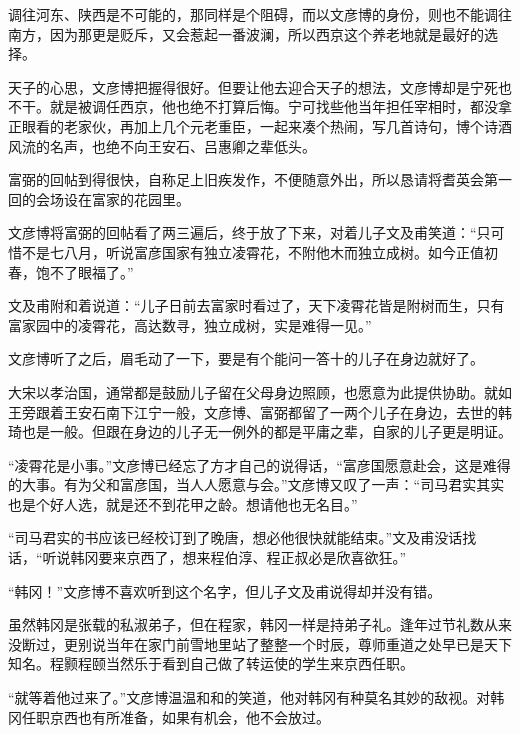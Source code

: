 调往河东、陕西是不可能的，那同样是个阻碍，而以文彦博的身份，则也不能调往南方，因为那更是贬斥，又会惹起一番波澜，所以西京这个养老地就是最好的选择。

天子的心思，文彦博把握得很好。但要让他去迎合天子的想法，文彦博却是宁死也不干。就是被调任西京，他也绝不打算后悔。宁可找些他当年担任宰相时，都没拿正眼看的老家伙，再加上几个元老重臣，一起来凑个热闹，写几首诗句，博个诗酒风流的名声，也绝不向王安石、吕惠卿之辈低头。

富弼的回帖到得很快，自称足上旧疾发作，不便随意外出，所以恳请将耆英会第一回的会场设在富家的花园里。

文彦博将富弼的回帖看了两三遍后，终于放了下来，对着儿子文及甫笑道：“只可惜不是七八月，听说富彦国家有独立凌霄花，不附他木而独立成树。如今正值初春，饱不了眼福了。”

文及甫附和着说道：“儿子日前去富家时看过了，天下凌霄花皆是附树而生，只有富家园中的凌霄花，高达数寻，独立成树，实是难得一见。”

文彦博听了之后，眉毛动了一下，要是有个能问一答十的儿子在身边就好了。

大宋以孝治国，通常都是鼓励儿子留在父母身边照顾，也愿意为此提供协助。就如王旁跟着王安石南下江宁一般，文彦博、富弼都留了一两个儿子在身边，去世的韩琦也是一般。但跟在身边的儿子无一例外的都是平庸之辈，自家的儿子更是明证。

“凌霄花是小事。”文彦博已经忘了方才自己的说得话，“富彦国愿意赴会，这是难得的大事。有为父和富彦国，当人人愿意与会。”文彦博又叹了一声：“司马君实其实也是个好人选，就是还不到花甲之龄。想请他也无名目。”

“司马君实的书应该已经校订到了晚唐，想必他很快就能结束。”文及甫没话找话，“听说韩冈要来京西了，想来程伯淳、程正叔必是欣喜欲狂。”

“韩冈！”文彦博不喜欢听到这个名字，但儿子文及甫说得却并没有错。

虽然韩冈是张载的私淑弟子，但在程家，韩冈一样是持弟子礼。逢年过节礼数从来没断过，更别说当年在家门前雪地里站了整整一个时辰，尊师重道之处早已是天下知名。程颢程颐当然乐于看到自己做了转运使的学生来京西任职。

“就等着他过来了。”文彦博温温和和的笑道，他对韩冈有种莫名其妙的敌视。对韩冈任职京西也有所准备，如果有机会，他不会放过。

